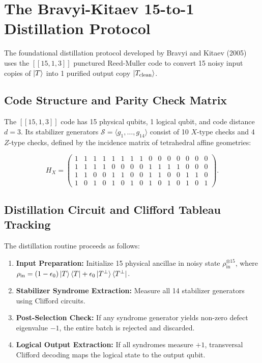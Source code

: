 \section{The Bravyi-Kitaev 15-to-1 Distillation Protocol}
\label{sec:bravyi_kitaev_15_to_1}

The foundational distillation protocol developed by Bravyi and Kitaev (2005) uses the $[[15, 1, 3]]$ punctured Reed-Muller code to convert 15 noisy input copies of $\ket{T}$ into 1 purified output copy $\ket{T_{\text{clean}}}$.

\subsection{Code Structure and Parity Check Matrix}
The $[[15, 1, 3]]$ code has 15 physical qubits, 1 logical qubit, and code distance $d = 3$. Its stabilizer generators $\mathcal{S} = \langle g_1, \dots, g_{14} \rangle$ consist of 10 $X$-type checks and 4 $Z$-type checks, defined by the incidence matrix of tetrahedral affine geometries:

\begin{equation}
    H_X = \begin{pmatrix}
    1 & 1 & 1 & 1 & 1 & 1 & 1 & 1 & 0 & 0 & 0 & 0 & 0 & 0 & 0 \\
    1 & 1 & 1 & 1 & 0 & 0 & 0 & 0 & 1 & 1 & 1 & 1 & 0 & 0 & 0 \\
    1 & 1 & 0 & 0 & 1 & 1 & 0 & 0 & 1 & 1 & 0 & 0 & 1 & 1 & 0 \\
    1 & 0 & 1 & 0 & 1 & 0 & 1 & 0 & 1 & 0 & 1 & 0 & 1 & 0 & 1
    \end{pmatrix}.
\end{equation}

\subsection{Distillation Circuit and Clifford Tableau Tracking}
The distillation routine proceeds as follows:
\begin{enumerate}
    \item \textbf{Input Preparation:} Initialize 15 physical ancillae in noisy state $\rho_{\text{in}}^{\otimes 15}$, where $\rho_{\text{in}} = (1-\epsilon_0)\ket{T}\bra{T} + \epsilon_0\ket{T^\perp}\bra{T^\perp}$.
    \item \textbf{Stabilizer Syndrome Extraction:} Measure all 14 stabilizer generators using Clifford circuits.
    \item \textbf{Post-Selection Check:} If any syndrome generator yields non-zero defect eigenvalue $-1$, the entire batch is rejected and discarded.
    \item \textbf{Logical Output Extraction:} If all syndromes measure $+1$, transversal Clifford decoding maps the logical state to the output qubit.
\end{enumerate}


